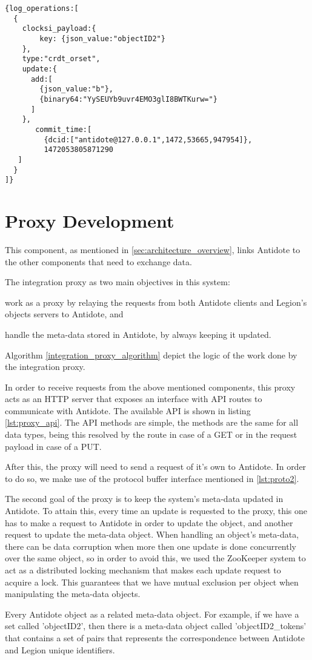 \begin{lstlisting}[caption={Antidote log response example},label={lst:log_example}]
{log_operations:[
  {
    clocksi_payload:{
        key: {json_value:"objectID2"}
    },
    type:"crdt_orset",
    update:{
      add:[
        {json_value:"b"},
        {binary64:"YySEUYb9uvr4EMO3glI8BWTKurw="}
      ]
    },
       commit_time:[
         {dcid:["antidote@127.0.0.1",1472,53665,947954]},
         1472053805871290
   ]
  }
]}
\end{lstlisting}

\section{Proxy Development}
\label{sec:proxy_development}
This component, as mentioned in \ref{sec:architecture_overview}, links Antidote to the other components that need to exchange data.\par
	The integration proxy as two main objectives in this system: 
\begin{enumerate*}[(i)]
\item work as a proxy by relaying the requests from both Antidote clients and Legion's objects servers to Antidote, and 
\item handle the meta-data stored in Antidote, by always keeping it updated.
\end{enumerate*}
Algorithm \ref{integration_proxy_algorithm} depict the logic of the work done by the integration proxy.\par
	In order to receive requests from the above mentioned components, this proxy acts as an HTTP server that exposes an interface with API routes to communicate with Antidote. The available API is shown in listing \ref{lst:proxy_api}. The API methods are simple, the methods are the same for all data types, being this resolved by the route in case of a GET or in the request payload in case of a PUT.\par
	After this, the proxy will need to send a request of it's own to Antidote. In order to do so, we make use of the protocol buffer interface mentioned in \ref{lst:proto2}.\par
	The second goal of the proxy is to keep the system's meta-data updated in Antidote. To attain this, every time an update is requested to the proxy, this one has to make a request to Antidote in order to update the object, and another request to update the meta-data object. When handling an object's meta-data, there can be data corruption when more then one update is done concurrently over the same object, so in order to avoid this, we used the ZooKeeper system to act as a distributed locking mechanism that makes each update request to acquire a lock. This guarantees that we have mutual exclusion per object when manipulating the meta-data objects.\par
	Every Antidote object as a related meta-data object. For example, if we have a set called 'objectID2', then there is a meta-data object called 'objectID2\_tokens' that contains a set of pairs that represents the correspondence between Antidote and Legion unique identifiers.
	
